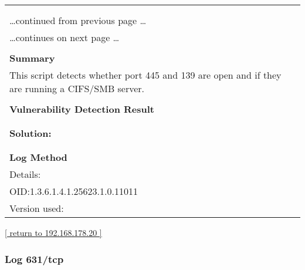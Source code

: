 \documentclass{article}
\begin{document}
\begin{longtable}{|p{}|}
\hline
\rowcolor{gvm_log}{\color{white}{Log (CVSS: 0.0) }}\\
\rowcolor{gvm_log}{\color{white}{NVT: SMB/CIFS Server Detection}}\\
\hline
\endfirsthead
\hfill\ldots continued from previous page \ldots \\
\hline
\endhead
\hline
\ldots continues on next page \ldots \\
\endfoot
\hline
\endlastfoot
\\
\textbf{Summary}\\
This script detects whether port 445 and 139 are open and
  if they are running a CIFS/SMB server.\\

        \hline
        \\
\textbf{Vulnerability Detection Result}\\
\rowcolor{white}{\verb=A SMB server is running on this port=}\\

          \hline
          \\
\textbf{Solution:}\\
\\


        \hline
        \\
\textbf{Log Method}\\
Details:
\rowcolor{white}{\verb=SMB/CIFS Server Detection=}\\
OID:1.3.6.1.4.1.25623.1.0.11011\\
Version used:
\rowcolor{white}{\verb=2020-11-10T15:30:28Z=}\\
\end{longtable}

\begin{footnotesize}\hyperref[host:192.168.178.20]{[ return to 192.168.178.20 ]}\end{footnotesize}
\subsubsection{Log 631/tcp}
\label{port:192.168.178.20 631/tcp Log}
\end{document}
